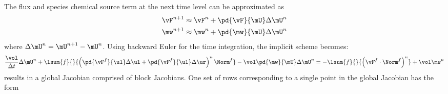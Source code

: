 The flux and species chemical source term at the next time level can be
approximated as
\begin{align}
  \vF^{n+1} &\approx \vF^n + \pd{\vF}{\mU} \Delta \mU^n \\
  \mw^{n+1} &\approx \mw^n + \pd{\mw}{\mU} \Delta \mU^n
  \label{fc-fluxes-timelevel}
\end{align}
where $\Delta \mU^n = \mU^{n+1} - \mU^{n}$.  Using backward Euler for the time
integration, the implicit scheme becomes:
\begin{equation}
	  \frac{\vol}{\Delta t} \Delta \mU^n
    +\lsum{f}{}{
      \left(\pd{\vF^f}{\ul} \Delta \ul + \pd{\vF^f}{\ul} \Delta \ur \right)^n 
      \Norm^f
    } - \vol \pd{\mw}{\mU}
  \Delta \mU^n
  = - \lsum{f}{}{\left( \vF^f \cdot \Norm^f \right)^n} + \vol \mw^n
  \label{fc-explicit}
\end{equation}
 results in a global Jacobian comprised of block Jacobians.
One set of rows corresponding to a single point in the global Jacobian has the
form
